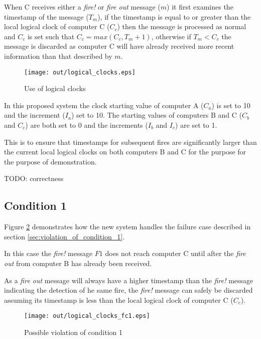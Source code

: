 \documentclass[twocolumn]{article}
\begin{document}
When C receives either a \textit{fire!} or \textit{fire out} message ($m$) it
first examines the timestamp of the message ($T_{m}$), if the timestamp is equal
to or greater than the local logical clock of computer C ($C_{c}$) then the
message is processed as normal and $C_{c}$ is set such that $C_{c} = max(C_{c},
T_{m} + 1)$, otherwise if $T_{m} < C_{c}$ the message is discarded as computer C
will have already received more recent information than that described by $m$.

\begin{figure}[h!]
  \centering
  \texttt{[image: out/logical\_clocks.eps]}
  \caption{Use of logical clocks}
  \label{fig:logical_clocks}
\end{figure}

In this proposed system the clock starting value of computer A ($C_{a}$) is set
to 10 and the increment ($I_{a}$) set to 10. The starting values of computers B
and C ($C_{b}$ and $C_{c}$) are both set to 0 and the increments ($I_{b}$ and
$I_{c}$) are set to 1.

This is to ensure that timestamps for subsequent fires are significantly larger
than the current local logical clocks on both computers B and C for the purpose
for the purpose of demonstration.

TODO: correctness

\subsection{Condition 1}

Figure \ref{fig:logical_clocks_fc1} demonstrates how the new system handles the
failure case described in section \ref{sec:violation_of_condition_1}.

In this case the \textit{fire!} message $F1$ does not reach computer C until
after the \textit{fire out} from computer B has already been received.

As a \textit{fire out} message will always have a higher timestamp than the
\textit{fire!} message indicating the detection of he same fire, the
\textit{fire!} message can safely be discarded assuming its timestamp is less
than the local logical clock of computer C ($C_{c}$).

\begin{figure}[h!]
  \centering
  \texttt{[image: out/logical\_clocks\_fc1.eps]}
  \caption{Possible violation of condition 1}
  \label{fig:logical_clocks_fc1}
\end{figure}
\end{document}
